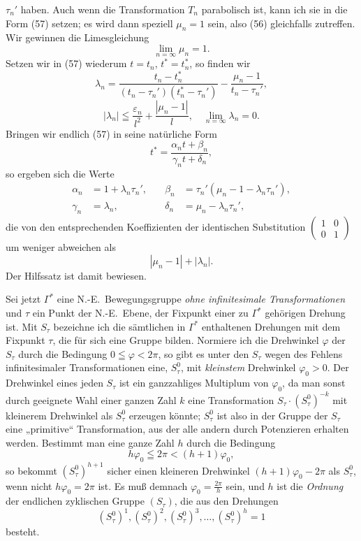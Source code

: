 \documentclass{article}
\begin{document}
$\tau_n'$ haben. Auch wenn die Transformation $T_n$ parabolisch ist, kann ich sie in die Form (57) setzen; es wird dann speziell $\mu_n = 1$ sein, also (56) gleichfalls zutreffen. Wir gewinnen die Limesgleichung
\[ \lim_{n = \infty} \mu_n = 1. \]
Setzen wir in (57) wiederum $t = t_n$, $t^* = t_n^*$, so finden wir
\[ \lambda_n = \frac{t_n - t_n^*}{(t_n - \tau_n')(t_n^* - \tau_n')} - \frac{\mu_n - 1}{t_n - \tau_n'}, \]
\[ |\lambda_n| \leqq \frac{\varepsilon_n}{l^2} + \frac{|\mu_n - 1|}{l}, \quad \lim_{n = \infty} \lambda_n = 0. \]
Bringen wir endlich (57) in seine natürliche Form
\[ t^* = \frac{\alpha_n t + \beta_n}{\gamma_n t + \delta_n}, \]
so ergeben sich die Werte
\[ \begin{aligned} \alpha_n &= 1 + \lambda_n \tau_n', &\quad \beta_n &= \tau_n'(\mu_n - 1 - \lambda_n \tau_n'), \\ \gamma_n &= \lambda_n, &\quad \delta_n &= \mu_n - \lambda_n \tau_n', \end{aligned} \]
die von den entsprechenden Koeffizienten der identischen Substitution $\begin{pmatrix} 1 & 0 \\ 0 & 1 \end{pmatrix}$ um weniger abweichen als
\[ |\mu_n - 1| + |\lambda_n|. \]
Der Hilfssatz ist damit bewiesen.

Sei jetzt $\varGamma^*$ eine N.-E.\ Bewegungsgruppe \emph{ohne infinitesimale Transformationen} und $\tau$ ein Punkt der N.-E.\ Ebene, der Fixpunkt einer zu $\varGamma^*$ gehörigen Drehung ist. Mit $S_\tau$ bezeichne ich die sämtlichen in $\varGamma^*$ enthaltenen Drehungen mit dem Fixpunkt $\tau$, die für sich eine Gruppe bilden. Normiere ich die Drehwinkel $\varphi$ der $S_\tau$ durch die Bedingung $0 \leqq \varphi < 2\pi$, so gibt es unter den $S_\tau$ wegen des Fehlens infinitesimaler Transformationen eine, $S_\tau^0$, mit \emph{kleinstem} Drehwinkel $\varphi_0 > 0$. Der Drehwinkel eines jeden $S_\tau$ ist ein ganzzahliges Multiplum von $\varphi_0$, da man sonst durch geeignete Wahl einer ganzen Zahl $k$ eine Transformation $S_\tau \cdot (S_\tau^0)^{-k}$ mit kleinerem Drehwinkel als $S_\tau^0$ erzeugen könnte; $S_\tau^0$ ist also in der Gruppe der $S_\tau$ eine „primitive“ Transformation, aus der alle andern durch Potenzieren erhalten werden. Bestimmt man eine ganze Zahl $h$ durch die Bedingung
\[ h\varphi_0 \leqq 2\pi < (h + 1)\varphi_0, \]
so bekommt $(S_\tau^0)^{h+1}$ sicher einen kleineren Drehwinkel $(h + 1)\varphi_0 - 2\pi$ als $S_\tau^0$, wenn nicht $h\varphi_0 = 2\pi$ ist. Es muß demnach $\varphi_0 = \frac{2\pi}{h}$ sein, und $h$ ist die \emph{Ordnung} der endlichen zyklischen Gruppe $(S_\tau)$, die aus den Drehungen
\[ (S_\tau^0)^1, (S_\tau^0)^2, (S_\tau^0)^3, \dots, (S_\tau^0)^h = 1 \]
besteht.
\end{document}
